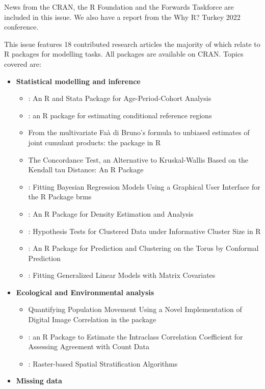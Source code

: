 News from the CRAN, the R Foundation and the Forwards Taskforce are included in this issue. We also have a report from the Why R? Turkey 2022 conference.

This issue features 18 contributed research articles the majority of which relate to R packages
for modelling tasks. All packages are available on CRAN. Topics covered are:

\begin{itemize}
\tightlist
\item
  \textbf{Statistical modelling and inference}

  \begin{itemize}
  \tightlist
  \item
    : An R and Stata Package for Age-Period-Cohort Analysis
  \item
    : an R package for estimating conditional reference regions
  \item
    From the multivariate Faà di Bruno's formula to unbiased estimates of joint cumulant products: the  package in R
  \item
    The Concordance Test, an Alternative to Kruskal-Wallis Based on the Kendall tau Distance: An R Package
  \item
    : Fitting Bayesian Regression Models Using a Graphical User Interface for the R Package brms
  \item
    : An R Package for Density Estimation and Analysis
  \item
    : Hypothesis Tests for Clustered Data under Informative Cluster Size in R
  \item
    : An R Package for Prediction and Clustering on the Torus by Conformal Prediction
  \item
    : Fitting Generalized Linear Models with Matrix Covariates
  \end{itemize}
\item
  \textbf{Ecological and Environmental analysis}

  \begin{itemize}
  \tightlist
  \item
    Quantifying Population Movement Using a Novel Implementation of Digital Image Correlation in the  package
  \item
    : an R Package to Estimate the Intraclass Correlation Coefficient for Assessing Agreement with Count Data
  \item
    : Raster-based Spatial Stratification Algorithms
  \end{itemize}
\item
  \textbf{Missing data}


\end{itemize}
